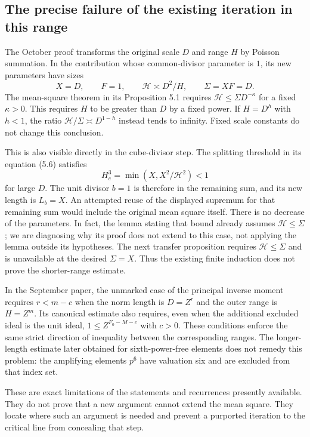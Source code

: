 \subsection{The precise failure of the existing iteration in this range}

The October proof transforms the original scale $D$ and
range $H$ by Poisson summation. In the contribution whose
common-divisor parameter is $1$, its new parameters have
sizes
\[
 X=D,\qquad F=1,\qquad \mathcal H\asymp D^2/H,
          \qquad\Sigma=XF=D.
\]
The mean-square theorem in its Proposition 5.1 requires
$\mathcal H\le\Sigma D^{-\kappa}$ for a fixed
$\kappa>0$. This requires $H$ to be greater than $D$
by a fixed power. If $H=D^h$ with $h<1$, the ratio
$\mathcal H/\Sigma\asymp D^{1-h}$ instead tends to
infinity. Fixed scale constants do not change this
conclusion.

This is also visible directly in the cube-divisor step.
The splitting threshold in its equation (5.6) satisfies
\[
 H_c^3=\min(X,X^2/\mathcal H^2)<1
\]
for large $D$. The unit divisor $b=1$ is therefore in
the remaining sum, and its new length is $L_b=X$.
An attempted reuse of the displayed supremum for that
remaining sum would include the original mean square itself.
There is no decrease of the parameters. In fact, the lemma
stating that bound already assumes $\mathcal H\le\Sigma$;
we are diagnosing why its proof does not extend to this
case, not applying the lemma outside its hypotheses. The next transfer proposition requires
$\mathcal H\le\Sigma$ and is unavailable at the desired
$\Sigma=X$. Thus the existing finite induction does not
prove the shorter-range estimate.

In the September paper, the unmarked case of the principal
inverse moment requires $r<m-c$ when the norm length is
$D=Z^r$ and the outer range is $H=Z^m$. Its canonical
estimate also requires, even when the additional excluded
ideal is the unit ideal,
$1\le Z^{F_0-M-c}$ with $c>0$. These conditions enforce
the same strict direction of inequality between the
corresponding ranges. The longer-length estimate later
obtained for sixth-power-free elements does not remedy this
problem: the amplifying elements $p^6$ have valuation six
and are excluded from that index set.

These are exact limitations of the statements and
recurrences presently available. They do not prove that a
new argument cannot extend the mean square. They locate
where such an argument is needed and prevent a purported
iteration to the critical line from concealing that step.

